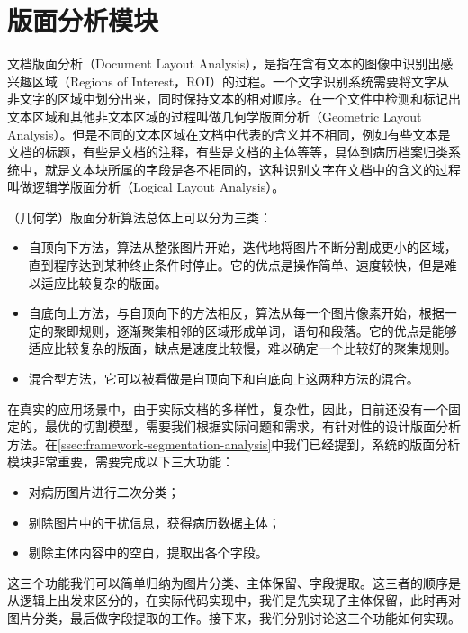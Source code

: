 \section{版面分析模块}  %
文档版面分析（Document Layout Analysis），是指在含有文本的图像中识别出感兴趣区域（Regions of Interest，ROI）的过程。一个文字识别系统需要将文字从非文字的区域中划分出来，同时保持文本的相对顺序\citep{baird1992anatomy}。在一个文件中检测和标记出文本区域和其他非文本区域的过程叫做几何学版面分析（Geometric Layout Analysis）\citep{cattoni1998geometric}。但是不同的文本区域在文档中代表的含义并不相同，例如有些文本是文档的标题，有些是文档的注释，有些是文档的主体等等，具体到病历档案归类系统中，就是文本块所属的字段是各不相同的，这种识别文字在文档中的含义的过程叫做逻辑学版面分析（Logical Layout Analysis）\citep{haralick1994document}。

（几何学）版面分析算法总体上可以分为三类\citep{mao2003document}：
\begin{itemize}
	\item 自顶向下方法，算法从整张图片开始，迭代地将图片不断分割成更小的区域，直到程序达到某种终止条件时停止。它的优点是操作简单、速度较快，但是难以适应比较复杂的版面\citep{nagy1992prototype}\citep{baird1990image}。
	\item 自底向上方法，与自顶向下的方法相反，算法从每一个图片像素开始，根据一定的聚即规则，逐渐聚集相邻的区域形成单词，语句和段落。它的优点是能够适应比较复杂的版面，缺点是速度比较慢，难以确定一个比较好的聚集规则\citep{o1993document}\citep{kise1998segmentation}。
	\item 混合型方法，它可以被看做是自顶向下和自底向上这两种方法的混合\citep{pavlidis1992page}。
\end{itemize}

在真实的应用场景中，由于实际文档的多样性，复杂性，因此，目前还没有一个固定的，最优的切割模型，需要我们根据实际问题和需求，有针对性的设计版面分析方法。在\autoref{ssec:framework-segmentation-analysis}中我们已经提到，系统的版面分析模块非常重要，需要完成以下三大功能：
\begin{itemize}
	\item 对病历图片进行二次分类；
	\item 剔除图片中的干扰信息，获得病历数据主体；
	\item 剔除主体内容中的空白，提取出各个字段。
\end{itemize}
这三个功能我们可以简单归纳为图片分类、主体保留、字段提取。这三者的顺序是从逻辑上出发来区分的，在实际代码实现中，我们是先实现了主体保留，此时再对图片分类，最后做字段提取的工作。接下来，我们分别讨论这三个功能如何实现。

